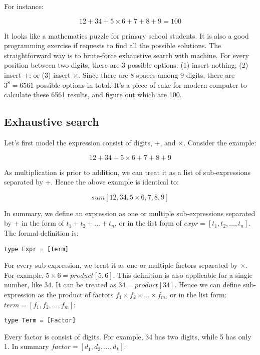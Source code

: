 \documentclass{article}
\begin{document}
For instance:

\[
12 + 34 + 5 \times 6 + 7 + 8 + 9 = 100
\]

It looks like a mathematics puzzle for primary school students. It is also a good programming exercise if requests to find all the possible solutions. The straightforward way is to brute-force exhaustive search with machine. For every position between two digits, there are 3 possible options: (1) insert nothing; (2) insert +; or (3) insert $\times$. Since there are 8 spaces among 9 digits, there are $3^8 = 6561$ possible options in total. It's a piece of cake for modern computer to calculate these 6561 results, and figure out which are 100.

\subsection{Exhaustive search}

Let's first model the expression consist of digits, +, and $\times$. Consider the example:

\[
12 + 34 + 5 \times 6 + 7 + 8 + 9
\]

As multiplication is prior to addition, we can treat it as a list of sub-expressions separated by +. Hence the above example is identical to:

\[
sum [12, 34, 5 \times 6, 7, 8, 9]
\]

In summary, we define an expression as one or multiple sub-expressions separated by + in the form of $t_1 + t_2 + ... + t_n$, or in the list form of $expr = [t_1, t_2, ..., t_n]$. The formal definition is:

\lstset{frame = none}
\begin{lstlisting}
type Expr = [Term]
\end{lstlisting}

For every sub-expression, we treat it as one or multiple factors separated by $\times$. For example, $5 \times 6 = product [5, 6]$. This definition is also applicable for a single number, like $34$. It can be treated as $34 = product [34]$. Hence we can define sub-expression as the product of factors $f_1 \times f_2 \times ... \times f_m$, or in the list form: $term = [f_1, f_2, ..., f_m]$:

\begin{lstlisting}
type Term = [Factor]
\end{lstlisting}

Every factor is consist of digits. For example, 34 has two digits, while 5 has only 1. In summary $factor = [d_1, d_2, ..., d_k]$.
\end{document}
